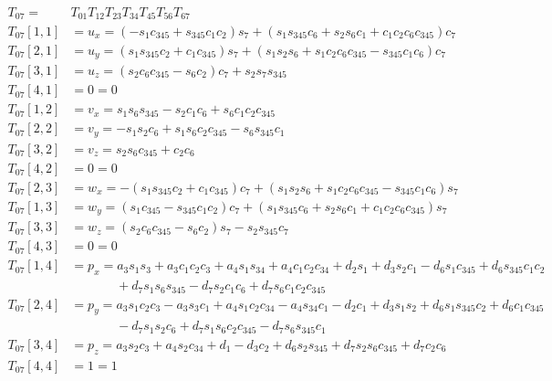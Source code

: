 \documentclass{article}
\begin{document}
\begin{align}
T_{07} =& T_{01} T_{12} T_{23} T_{34} T_{45} T_{56} T_{67} \label{direct} \\
T_{07}[1, 1] &= u_x =   \left(- s_{1} c_{345} + s_{345} c_{1} c_{2}\right) s_{7} + \left(s_{1} s_{345} c_{6} + s_{2} s_{6} c_{1} + c_{1} c_{2} c_{6} c_{345}\right) c_{7} \nonumber \\
T_{07}[2, 1] &= u_y =   \left(s_{1} s_{345} c_{2} + c_{1} c_{345}\right) s_{7} + \left(s_{1} s_{2} s_{6} + s_{1} c_{2} c_{6} c_{345} - s_{345} c_{1} c_{6}\right) c_{7} \nonumber \\
T_{07}[3, 1] &= u_z =   \left(s_{2} c_{6} c_{345} - s_{6} c_{2}\right) c_{7} + s_{2} s_{7} s_{345} \nonumber \\
T_{07}[4, 1] &=   0 = 0 \nonumber \\
T_{07}[1, 2] &= v_x =   s_{1} s_{6} s_{345} - s_{2} c_{1} c_{6} + s_{6} c_{1} c_{2} c_{345} \nonumber \\
T_{07}[2, 2] &= v_y =   - s_{1} s_{2} c_{6} + s_{1} s_{6} c_{2} c_{345} - s_{6} s_{345} c_{1} \nonumber \\
T_{07}[3, 2] &= v_z =   s_{2} s_{6} c_{345} + c_{2} c_{6} \nonumber \\
T_{07}[4, 2] &=   0 = 0 \nonumber \\
T_{07}[2, 3] &= w_x =   - \left(s_{1} s_{345} c_{2} + c_{1} c_{345}\right) c_{7} + \left(s_{1} s_{2} s_{6} + s_{1} c_{2} c_{6} c_{345} - s_{345} c_{1} c_{6}\right) s_{7} \nonumber \\
T_{07}[1, 3] &= w_y =   \left(s_{1} c_{345} - s_{345} c_{1} c_{2}\right) c_{7} + \left(s_{1} s_{345} c_{6} + s_{2} s_{6} c_{1} + c_{1} c_{2} c_{6} c_{345}\right) s_{7} \nonumber \\
T_{07}[3, 3] &= w_z =   \left(s_{2} c_{6} c_{345} - s_{6} c_{2}\right) s_{7} - s_{2} s_{345} c_{7} \nonumber \\
T_{07}[4, 3] &=   0 = 0 \nonumber \\
T_{07}[1, 4] &= p_x =   a_{3} s_{1} s_{3} + a_{3} c_{1} c_{2} c_{3} + a_{4} s_{1} s_{34} + a_{4} c_{1} c_{2} c_{34} + d_{2} s_{1} + d_{3} s_{2} c_{1} - d_{6} s_{1} c_{345} + d_{6} s_{345} c_{1} c_{2} \nonumber \\
              &\phantom{= a_b =}   + d_{7} s_{1} s_{6} s_{345} - d_{7} s_{2} c_{1} c_{6} + d_{7} s_{6} c_{1} c_{2} c_{345} \nonumber \\
T_{07}[2, 4] &= p_y =   a_{3} s_{1} c_{2} c_{3} - a_{3} s_{3} c_{1} + a_{4} s_{1} c_{2} c_{34} - a_{4} s_{34} c_{1} - d_{2} c_{1} + d_{3} s_{1} s_{2} + d_{6} s_{1} s_{345} c_{2} + d_{6} c_{1} c_{345} \nonumber \\
              &\phantom{= a_b =}   - d_{7} s_{1} s_{2} c_{6} + d_{7} s_{1} s_{6} c_{2} c_{345} - d_{7} s_{6} s_{345} c_{1} \nonumber \\
T_{07}[3, 4] &= p_z =   a_{3} s_{2} c_{3} + a_{4} s_{2} c_{34} + d_{1} - d_{3} c_{2} + d_{6} s_{2} s_{345} + d_{7} s_{2} s_{6} c_{345} + d_{7} c_{2} c_{6} \nonumber \\
T_{07}[4, 4] &=   1 = 1 \nonumber
\end{align}
\end{document}
